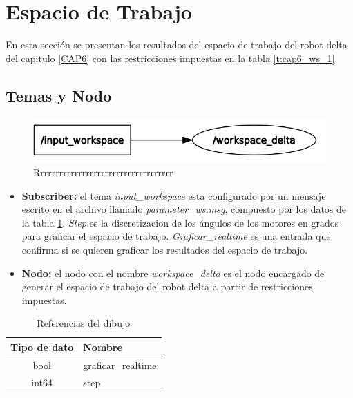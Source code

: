 \newpage


\section{Espacio de Trabajo}
        En esta sección se presentan los resultados del espacio de trabajo del robot delta del capitulo \ref{CAP6} con las restricciones impuestas en la tabla \ref{t:cap6_ws_1}
        
    \subsection{Temas y Nodo}
    
        \begin{figure}[h]
            \centering
            \includegraphics[width=1.0\linewidth]{Main/Chapter7/Images7/nodo_2.png}
            \caption{Rrrrrrrrrrrrrrrrrrrrrrrrrrrrrrrrrrrr}
            \label{f:cap7_rviz2222}
        \end{figure}    
    
    \begin{itemize}
        \item {\textbf{Subscriber:}  el tema \textit{input\_workspace} esta configurado por un mensaje escrito en el archivo llamado \textit{parameter\_ws.msg}, compuesto por los datos de la tabla \ref{tab:cap6_rviz_4_msg}. \textit{Step} es la discretizacion de los ángulos de los motores en grados para graficar el espacio de trabajo. \textit{Graficar\_realtime} es una entrada que confirma si se quieren graficar los resultados del espacio de trabajo. }
        \item {\textbf{Nodo:} el nodo con el nombre \textit{workspace\_delta} es el nodo encargado de generar el espacio de trabajo del robot delta a partir de restricciones impuestas.}
    \end{itemize}
    
        
            \begingroup
            \renewcommand{\arraystretch}{2.0}
            \begin{table}[H]
                \centering
                \begin{tabular}{c m{3.0cm}}
                   \hline                   \hline
                   \textbf{Tipo de dato}  & \textbf{Nombre}    \\\hline \hline 
                    bool & graficar\_realtime
                   \\\hline
                    int64 & step
                    \\\hline                   \hline
                \end{tabular}
                \caption{Referencias del dibujo}
                \label{tab:cap6_rviz_4_msg}
            \end{table}
        \endgroup    
        
